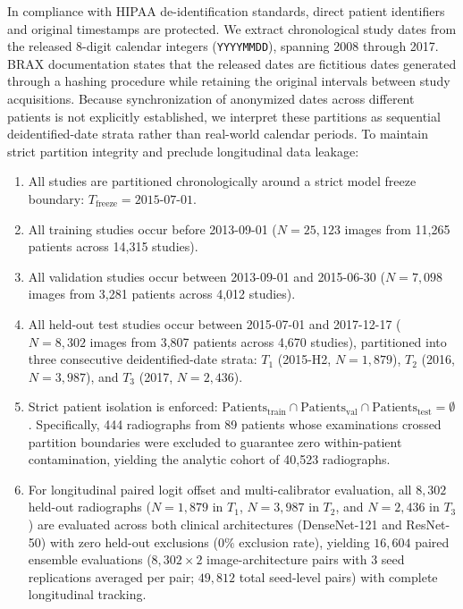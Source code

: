 \documentclass[preprint,12pt]{elsarticle}
\begin{document}
In compliance with HIPAA de-identification standards, direct patient identifiers and original timestamps are protected. We extract chronological study dates from the released 8-digit calendar integers (\texttt{YYYYMMDD}), spanning 2008 through 2017. BRAX documentation states that the released dates are fictitious dates generated through a hashing procedure while retaining the original intervals between study acquisitions. Because synchronization of anonymized dates across different patients is not explicitly established, we interpret these partitions as sequential deidentified-date strata rather than real-world calendar periods. To maintain strict partition integrity and preclude longitudinal data leakage:
\begin{enumerate}
    \item All studies are partitioned chronologically around a strict model freeze boundary: $T_{\text{freeze}} = \text{2015-07-01}$.
    \item All training studies occur before 2013-09-01 ($N = 25,123$ images from 11,265 patients across 14,315 studies).
    \item All validation studies occur between 2013-09-01 and 2015-06-30 ($N = 7,098$ images from 3,281 patients across 4,012 studies).
    \item All held-out test studies occur between 2015-07-01 and 2017-12-17 ($N = 8,302$ images from 3,807 patients across 4,670 studies), partitioned into three consecutive deidentified-date strata: $T_1$ (2015-H2, $N=1,879$), $T_2$ (2016, $N=3,987$), and $T_3$ (2017, $N=2,436$).
    \item Strict patient isolation is enforced: $\text{Patients}_{\text{train}} \cap \text{Patients}_{\text{val}} \cap \text{Patients}_{\text{test}} = \emptyset$. Specifically, 444 radiographs from 89 patients whose examinations crossed partition boundaries were excluded to guarantee zero within-patient contamination, yielding the analytic cohort of 40,523 radiographs.
    \item For longitudinal paired logit offset and multi-calibrator evaluation, all $8,302$ held-out radiographs ($N=1,879$ in $T_1$, $N=3,987$ in $T_2$, and $N=2,436$ in $T_3$) are evaluated across both clinical architectures (DenseNet-121 and ResNet-50) with zero held-out exclusions ($0\%$ exclusion rate), yielding $16,604$ paired ensemble evaluations ($8,302 \times 2$ image-architecture pairs with 3 seed replications averaged per pair; $49,812$ total seed-level pairs) with complete longitudinal tracking.
\end{enumerate}
\end{document}
